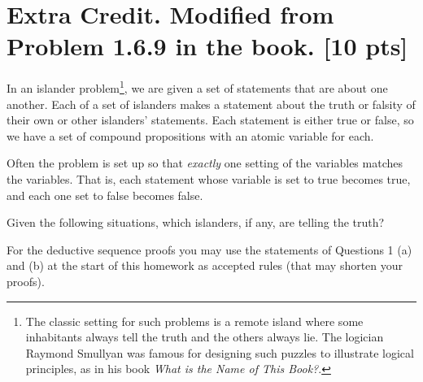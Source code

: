 \documentclass[12pt]{article}
\begin{document}
\section*{\textbf{Extra Credit. Modified from Problem 1.6.9 in the book.} [10 pts]}
In an islander problem\footnote{The classic setting for such problems is a remote island where some inhabitants always tell the truth and the others always lie. The logician Raymond Smullyan was famous for designing such puzzles to illustrate logical principles, as
in his book {\em What is the Name of This Book?}.}, we are given a set of statements that are about one another.
Each of a set of islanders makes a statement about the truth or falsity of their own or other
islanders’ statements. Each statement is either true or false, so we have a set of compound
propositions with an atomic variable for each. 

\medskip

Often  the problem is set up so that {\em exactly}
one setting of the variables matches the variables. That is, each statement whose variable
is set to true becomes true, and each one set to false becomes false.

\medskip

Given the following
situations, which islanders, if any, are telling the truth?

\medskip


For the deductive sequence proofs you may use the statements of Questions 1 (a) and (b) at the start of this homework as accepted rules (that may shorten your proofs).
\end{document}
